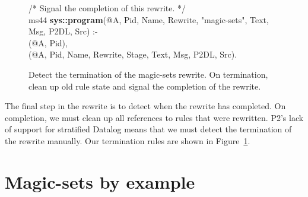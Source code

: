 \begin{figure}[!t]
\begin{boxedminipage}{\linewidth}
/* Signal the completion of this rewrite. */ \\
ms44 {\bf sys::program}(@A, Pid, Name, Rewrite, "magic-sets", Text, Msg, P2DL, Src) :- \\
(@A, Pid), \\
(@A, Pid, Name, Rewrite, Stage, Text, Msg, P2DL, Src).

\end{boxedminipage}
\caption{\label{ch:magic:fig:rewrite10} Detect the termination of the magic-sets rewrite. 
On termination, clean up old rule state and signal the completion of the rewrite.}
\end{figure}

The final step in the rewrite is to detect when the rewrite has completed.  On
completion, we must clean up all references to rules that were rewritten.  P2's
lack of support for stratified Datalog means that we must detect the
termination of the rewrite manually.  Our termination rules are shown in
Figure~\ref{ch:magic:fig:rewrite10}.


\section{Magic-sets by example}

